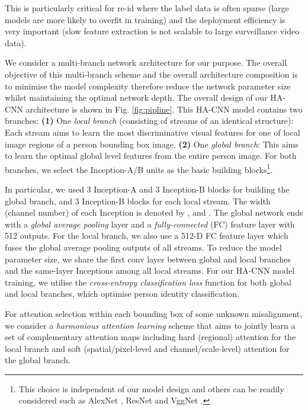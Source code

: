 \documentclass[10pt,twocolumn,letterpaper]{article}
\begin{document}
This is particularly critical for re-id
where the label data is often sparse 
(large models are more likely to overfit in training) 
and the deployment efficiency is very important 
(slow feature extraction is not scalable to large surveillance video data).



\vspace{0.1cm}
We consider a multi-branch network architecture for our purpose. The
overall objective of this multi-branch scheme and the overall
architecture composition is to minimise the model complexity therefore
reduce the network parameter size whilst maintaining the optimal
network depth. The overall design of our HA-CNN architecture is shown
in Fig. \ref{fig:pipline}.
This HA-CNN model contains two branches:
{\bf (1)} One {\em local branch} (consisting of  streams of an identical structure):
Each stream aims to learn the most discriminative visual
features for one of  local image regions of a person bounding box image.
{\bf (2)} One {\em global branch}:
This aims to learn the optimal global level features from the entire person image.
For both branches, we select the Inception-A/B units \cite{xiao2016learning,szegedy2017inception} 
as the basic building blocks\footnote{This choice is independent of our model design
and others can be readily considered such as
AlexNet \cite{krizhevsky2012imagenet},
ResNet \cite{he2016deep} and VggNet \cite{simonyan2014very}.}.

In particular, we used 3 Inception-A and 3 Inception-B blocks for building the global branch, 
and 3 Inception-B blocks for each local stream.
The width (channel number) of each Inception is denoted by ,  and .
The global network ends with a \textit{global average pooling} layer and 
a \textit{fully-connected} (FC) feature layer with 512 outputs. 
For the local branch, we also use a 512-D FC feature layer 
which fuses the {global average pooling} outputs of all streams. 
To reduce the model parameter size, 
we share 
the first conv layer between global and local branches
and the same-layer Inceptions among all local streams.
For our HA-CNN model training, we utilise the {\em cross-entropy classification loss} function for both global and local branches, which optimise person identity classification.

For attention selection within each bounding box of some unknown misalignment,
we consider a {\em harmonious attention learning} scheme
that aims to jointly learn a set of complementary attention maps including
hard (regional) attention for the local branch and soft (spatial/pixel-level and channel/scale-level) attention
for the global branch.
\end{document}
